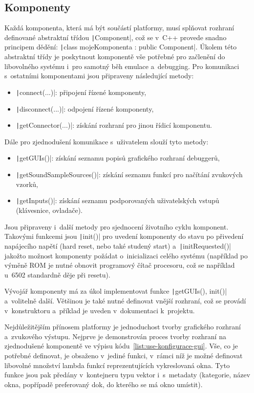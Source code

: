 \subsection{Komponenty}
Každá komponenta, která má být součástí platformy, musí splňovat rozhraní definované abstraktní třídou \texttt|Component|, což se v~C++ provede snadno principem dědění: \texttt|class mojeKomponenta : public Component|. Úkolem této abstraktní třídy je poskytnout komponentě vše potřebné pro začlenění do libovolného systému i~pro samotný běh emulace a~debugging. Pro komunikaci s~ostatními komponentami jsou připraveny následující metody:
\begin{itemize}
	\item \texttt|connect(...)|: připojení řízené komponenty,
	\item \texttt|disconnect(...)|: odpojení řízené komponenty,
	\item \texttt|getConnector(...)|: získání rozhraní pro jinou řídicí komponentu.
\end{itemize}

Dále pro zjednodušení komunikace s~uživatelem slouží tyto metody:
\begin{itemize}
	\item \texttt|getGUIs()|: získání seznamu popisů grafického rozhraní debuggerů,
	\item \texttt|getSoundSampleSources()|: získání seznamu funkcí pro načítání zvukových vzorků,
	\item \texttt|getInputs()|: získání seznamu podporovaných uživatelských vstupů (klávesnice, ovladače).
\end{itemize}

Jsou připraveny i~další metody pro sjednocení životního cyklu komponent. Takovými funkcemi jsou \texttt|init()| pro uvedení komponenty do stavu po přivedení napájecího napětí (hard reset, nebo také studený start) a~\texttt|initRequested()| jakožto možnost komponenty požádat o~inicializaci celého systému (například po výměně ROM je nutné obnovit programový čítač procesoru, což se například u~6502 standardně děje při resetu).

Vývojář komponenty má za úkol implementovat funkce \texttt|getGUIs(), init()| a~volitelně další. Většinou je také nutné definovat vnější rozhraní, což se provádí v~konstruktoru a~příklad je uveden v~dokumentaci k~projektu.

Nejdůležitějším přínosem platformy je jednoduchost tvorby grafického rozhraní a~zvukového výstupu. Nejprve je demonstrován proces tvorby rozhraní na zjednodušené komponentě ve výpisu kódu~\ref{list:use-konfigurace-gui}. Vše, co je potřebné definovat, je obsaženo v~jediné funkci, v~rámci níž je možné definovat libovolné množství lambda funkcí reprezentujících vykreslovaná okna. Tyto funkce jsou pak předány v~kontejneru typu vektor i~s~metadaty (kategorie, název okna, popřípadě preferovaný dok, do kterého se má okno umístit).

